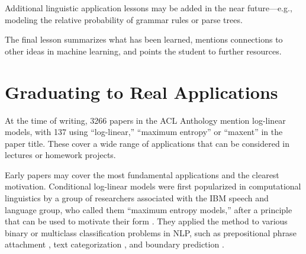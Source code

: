 \documentclass[11pt,letterpaper]{article}
\begin{document}
% 

Additional linguistic application lessons may be added in the near
future---e.g., modeling the relative probability of grammar rules or
parse trees.

The final lesson summarizes what has been learned, mentions connections
to other ideas in machine learning, and points the student to further
resources.


\section{Graduating to Real Applications}\label{sec:history}

At the time of writing, 3266 papers in the ACL Anthology mention
log-linear models, with 137 using ``log-linear,'' ``maximum entropy''
or ``maxent'' in the paper title.  These cover a wide range of
applications that can be considered in lectures or homework projects.

Early papers may cover the most fundamental applications and the
clearest motivation.  Conditional log-linear models were first
popularized in computational linguistics by a group of researchers
associated with the IBM speech and language group, who called them
``maximum entropy models,'' after a principle that can be used to
motivate their form \cite{jaynes-1957}.  They applied the method to
various binary or multiclass classification problems in NLP, such as
prepositional phrase attachment \cite{ratnaparkhi-1994}, text
categorization \cite{nigam-lafferty-mccallum-1999}, and boundary
prediction \cite{beeferman-berger-lafferty-1999}.
\end{document}
